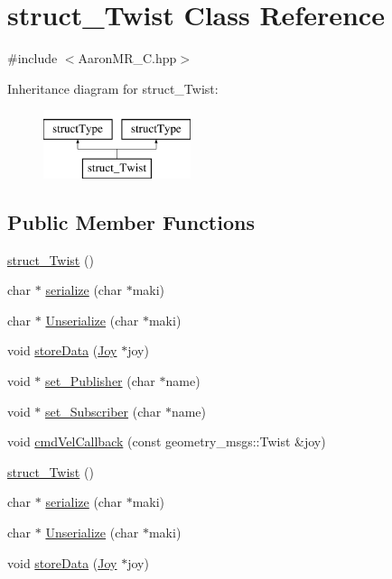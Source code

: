 \hypertarget{classstruct__Twist}{
\section{struct\_\-Twist Class Reference}
\label{classstruct__Twist}
}


{\ttfamily \#include $<$AaronMR\_\-C.hpp$>$}

Inheritance diagram for struct\_\-Twist:\begin{figure}[H]
\begin{center}
\leavevmode
\includegraphics[height=2cm]{classstruct__Twist}
\end{center}
\end{figure}
\subsection*{Public Member Functions}
\begin{DoxyCompactItemize}
\item 
\hyperlink{classstruct__Twist_a164175a79d7c3c66dbd7fdbcea350029}{struct\_\-Twist} ()
\item 
char $\ast$ \hyperlink{classstruct__Twist_aee6e94e0914c89920f211a04b5ad4f9f}{serialize} (char $\ast$maki)
\item 
char $\ast$ \hyperlink{classstruct__Twist_a0531691876c9cbabb1932cb54592c956}{Unserialize} (char $\ast$maki)
\item 
void \hyperlink{classstruct__Twist_a0385da1a9307377c97fd0bee2c94f1f6}{storeData} (\hyperlink{structJoy}{Joy} $\ast$joy)
\item 
void $\ast$ \hyperlink{classstruct__Twist_adb9080f278fb0608806c42156f1f9d69}{set\_\-Publisher} (char $\ast$name)
\item 
void $\ast$ \hyperlink{classstruct__Twist_ae87a3d1851c29e2707ae7bd35fac323b}{set\_\-Subscriber} (char $\ast$name)
\item 
void \hyperlink{classstruct__Twist_aa4b5acddd72e4b9766989bd9be5e2285}{cmdVelCallback} (const geometry\_\-msgs::Twist \&joy)
\item 
\hyperlink{classstruct__Twist_a164175a79d7c3c66dbd7fdbcea350029}{struct\_\-Twist} ()
\item 
char $\ast$ \hyperlink{classstruct__Twist_afc5c6e9e092a700e3906e67d7918d4ab}{serialize} (char $\ast$maki)
\item 
char $\ast$ \hyperlink{classstruct__Twist_a69b1008d4218c372a14b7ce1e8d6d485}{Unserialize} (char $\ast$maki)
\item 
void \hyperlink{classstruct__Twist_a0385da1a9307377c97fd0bee2c94f1f6}{storeData} (\hyperlink{structJoy}{Joy} $\ast$joy)
\end{DoxyCompactItemize}
